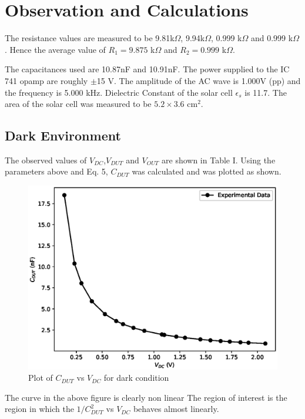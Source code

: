 \section{Observation and Calculations}

The resistance values are measured to be 9.81k$\Omega$, 9.94k$\Omega$, 0.999 k$\Omega$ and 0.999 k$\Omega$. Hence the average value of $R_1 = 9.875$ k$\Omega$ and $R_2 = 0.999$ k$\Omega$.

The capacitances used are 10.87nF and 10.91nF. The power supplied to the IC 741 opamp are roughly $\pm$15 V.
The amplitude of the AC wave is 1.000V (pp) and the frequency is 5.000 kHz. Dielectric Constant of the solar cell $\epsilon_s$ is 11.7. The area of the solar cell was measured to be $5.2 \times 3.6$ cm$^2$.

\subsection{Dark Environment}
The observed values of $V_{DC}$,$V_{DUT}$ and $V_{OUT}$ are shown in Table I.
Using the parameters above and Eq. 5, $C_{DUT}$ was calculated and was plotted as shown.



\begin{figure}
    \centering
    \includegraphics[width=1\columnwidth]{images/dark0.eps}
    \caption{Plot of $C_{DUT}$ vs $V_{DC}$ for dark condition}
\end{figure}

The curve in the above figure is clearly non linear The region of interest is the region in which
the $1/C^2_{DUT}$ vs $V_{DC}$ behaves almost linearly.

